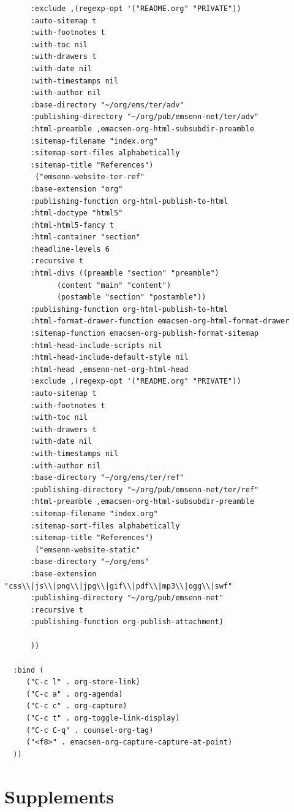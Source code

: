 \documentclass[11pt]{article}
\begin{document}
\begin{verbatim}
	  :exclude ,(regexp-opt '("README.org" "PRIVATE"))
	  :auto-sitemap t
	  :with-footnotes t
	  :with-toc nil
	  :with-drawers t
	  :with-date nil
	  :with-timestamps nil
	  :with-author nil
	  :base-directory "~/org/ems/ter/adv"
	  :publishing-directory "~/org/pub/emsenn-net/ter/adv"
	  :html-preamble ,emacsen-org-html-subsubdir-preamble
	  :sitemap-filename "index.org"
	  :sitemap-sort-files alphabetically
	  :sitemap-title "References")
	   ("emsenn-website-ter-ref"
	  :base-extension "org"
	  :publishing-function org-html-publish-to-html
	  :html-doctype "html5"
	  :html-html5-fancy t
	  :html-container "section"
	  :headline-levels 6
	  :recursive t
	  :html-divs ((preamble "section" "preamble")
		    (content "main" "content")
		    (postamble "section" "postamble"))
	  :publishing-function org-html-publish-to-html
	  :html-format-drawer-function emacsen-org-html-format-drawer
	  :sitemap-function emacsen-org-publish-format-sitemap
	  :html-head-include-scripts nil
	  :html-head-include-default-style nil
	  :html-head ,emsenn-net-org-html-head
	  :exclude ,(regexp-opt '("README.org" "PRIVATE"))
	  :auto-sitemap t
	  :with-footnotes t
	  :with-toc nil
	  :with-drawers t
	  :with-date nil
	  :with-timestamps nil
	  :with-author nil
	  :base-directory "~/org/ems/ter/ref"
	  :publishing-directory "~/org/pub/emsenn-net/ter/ref"
	  :html-preamble ,emacsen-org-html-subsubdir-preamble
	  :sitemap-filename "index.org"
	  :sitemap-sort-files alphabetically
	  :sitemap-title "References")
	   ("emsenn-website-static"
	  :base-directory "~/org/ems"
	  :base-extension "css\\|js\\|png\\|jpg\\|gif\\|pdf\\|mp3\\|ogg\\|swf"
	  :publishing-directory "~/org/pub/emsenn-net"
	  :recursive t
	  :publishing-function org-publish-attachment)

	  ))

  :bind (
	 ("C-c l" . org-store-link)
	 ("C-c a" . org-agenda)
	 ("C-c c" . org-capture)
	 ("C-c t" . org-toggle-link-display)
	 ("C-c C-q" . counsel-org-tag)
	 ("<f8>" . emacsen-org-capture-capture-at-point)
  ))

\end{verbatim}
\stopcontents[level-3]
\stopcontents[level-2]
\stopcontents[level-1]
\section*{Supplements}
\label{sec:orgc0a48d9}
\startcontents[level-1]
\end{document}
